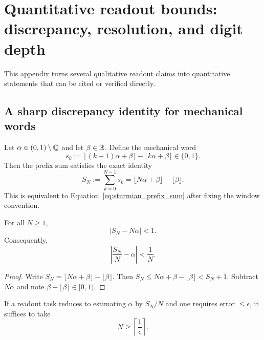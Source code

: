 \section{Quantitative readout bounds: discrepancy, resolution, and digit depth}
\label{app:readout_bounds}

This appendix turns several qualitative readout claims into quantitative statements that can be cited or verified directly.

\subsection{A sharp discrepancy identity for mechanical words}
Let $\alpha\in(0,1)\setminus\mathbb{Q}$ and let $\beta\in\mathbb{R}$.
Define the mechanical word
\begin{equation}
 s_k := \lfloor (k+1)\alpha+\beta\rfloor-\lfloor k\alpha+\beta\rfloor \in\{0,1\}.
\label{eq:mechanical_word_floor_def}
\end{equation}
Then the prefix sum satisfies the exact identity
\begin{equation}
S_N:=\sum_{k=0}^{N-1} s_k=\lfloor N\alpha+\beta\rfloor-\lfloor\beta\rfloor.
\end{equation}
This is equivalent to Equation~\eqref{eq:sturmian_prefix_sum} after fixing the window convention.

\begin{proposition}
\label{prop:uniform_discrepancy}
For all $N\ge 1$,
\begin{equation}
\bigl|S_N - N\alpha\bigr| < 1.
\label{eq:uniform_discrepancy_bound}
\end{equation}
Consequently,
\begin{equation}
\left|\frac{S_N}{N}-\alpha\right|<\frac{1}{N}.
\label{eq:alpha_estimate_error}
\end{equation}
\end{proposition}

\begin{proof}
Write $S_N=\lfloor N\alpha+\beta\rfloor-\lfloor\beta\rfloor$. Then
$S_N \le N\alpha+\beta-\lfloor\beta\rfloor < S_N+1$. Subtract $N\alpha$ and note $\beta-\lfloor\beta\rfloor\in[0,1)$.
\end{proof}

\begin{corollary}
\label{cor:prefix_for_epsilon}
If a readout task reduces to estimating $\alpha$ by $S_N/N$ and one requires error $\le \epsilon$, it suffices to take
\begin{equation}
N\ge \left\lceil\frac{1}{\epsilon}\right\rceil.
\end{equation}
\end{corollary}

